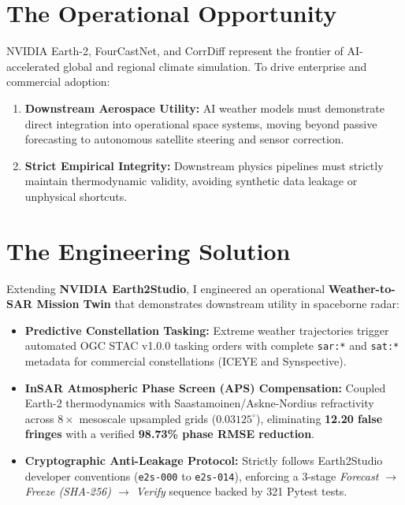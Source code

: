 \documentclass[10pt,letterpaper]{article}
\begin{document}
\noindent
\begin{minipage}[t]{0.51\textwidth}
    \section*{The Operational Opportunity}
    \footnotesize
    NVIDIA Earth-2, FourCastNet, and CorrDiff represent the frontier of AI-accelerated global and regional climate simulation. To drive enterprise and commercial adoption:
    \begin{enumerate}[leftmargin=12pt,topsep=1pt,itemsep=1pt,parsep=0pt]
        \item \textbf{Downstream Aerospace Utility:} AI weather models must demonstrate direct integration into operational space systems, moving beyond passive forecasting to autonomous satellite steering and sensor correction.
        \item \textbf{Strict Empirical Integrity:} Downstream physics pipelines must strictly maintain thermodynamic validity, avoiding synthetic data leakage or unphysical shortcuts.
    \end{enumerate}

    \section*{The Engineering Solution}
    \footnotesize
    Extending \textbf{NVIDIA Earth2Studio}, I engineered an operational \textbf{Weather-to-SAR Mission Twin} that demonstrates downstream utility in spaceborne radar:
    \begin{itemize}[leftmargin=12pt,topsep=1pt,itemsep=1pt,parsep=0pt]
        \item \textbf{Predictive Constellation Tasking:} Extreme weather trajectories trigger automated OGC STAC v1.0.0 tasking orders with complete \texttt{sar:*} and \texttt{sat:*} metadata for commercial constellations (ICEYE and Synspective).
        \item \textbf{InSAR Atmospheric Phase Screen (APS) Compensation:} Coupled Earth-2 thermodynamics with Saastamoinen/Askne-Nordius refractivity across $8\times$ mesoscale upsampled grids ($0.03125^\circ$), eliminating \textbf{12.20 false fringes} with a verified \textbf{98.73\% phase RMSE reduction}.
        \item \textbf{Cryptographic Anti-Leakage Protocol:} Strictly follows Earth2Studio developer conventions (\texttt{e2s-000} to \texttt{e2s-014}), enforcing a 3-stage \textit{Forecast $\rightarrow$ Freeze (SHA-256) $\rightarrow$ Verify} sequence backed by 321 Pytest tests.
    \end{itemize}


\end{minipage}
\end{document}
